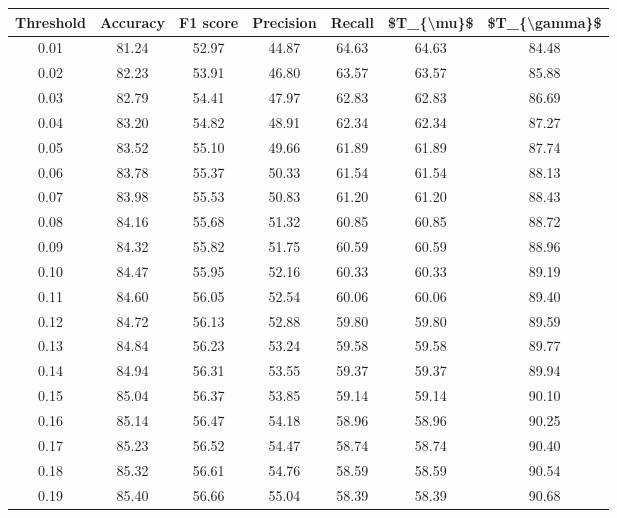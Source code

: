 \begin{tabular}{|c|c|c|c|c|c|c|}
\hline
 Threshold &  Accuracy &  F1 score &  Precision &  Recall &  \$T\_\{\textbackslash mu\}\$ &  \$T\_\{\textbackslash gamma\}\$ \\
\hline
      0.01 &     81.24 &     52.97 &      44.87 &   64.63 &      64.63 &         84.48 \\
      0.02 &     82.23 &     53.91 &      46.80 &   63.57 &      63.57 &         85.88 \\
      0.03 &     82.79 &     54.41 &      47.97 &   62.83 &      62.83 &         86.69 \\
      0.04 &     83.20 &     54.82 &      48.91 &   62.34 &      62.34 &         87.27 \\
      0.05 &     83.52 &     55.10 &      49.66 &   61.89 &      61.89 &         87.74 \\
      0.06 &     83.78 &     55.37 &      50.33 &   61.54 &      61.54 &         88.13 \\
      0.07 &     83.98 &     55.53 &      50.83 &   61.20 &      61.20 &         88.43 \\
      0.08 &     84.16 &     55.68 &      51.32 &   60.85 &      60.85 &         88.72 \\
      0.09 &     84.32 &     55.82 &      51.75 &   60.59 &      60.59 &         88.96 \\
      0.10 &     84.47 &     55.95 &      52.16 &   60.33 &      60.33 &         89.19 \\
      0.11 &     84.60 &     56.05 &      52.54 &   60.06 &      60.06 &         89.40 \\
      0.12 &     84.72 &     56.13 &      52.88 &   59.80 &      59.80 &         89.59 \\
      0.13 &     84.84 &     56.23 &      53.24 &   59.58 &      59.58 &         89.77 \\
      0.14 &     84.94 &     56.31 &      53.55 &   59.37 &      59.37 &         89.94 \\
      0.15 &     85.04 &     56.37 &      53.85 &   59.14 &      59.14 &         90.10 \\
      0.16 &     85.14 &     56.47 &      54.18 &   58.96 &      58.96 &         90.25 \\
      0.17 &     85.23 &     56.52 &      54.47 &   58.74 &      58.74 &         90.40 \\
      0.18 &     85.32 &     56.61 &      54.76 &   58.59 &      58.59 &         90.54 \\
      0.19 &     85.40 &     56.66 &      55.04 &   58.39 &      58.39 &         90.68 \\

\end{tabular}
